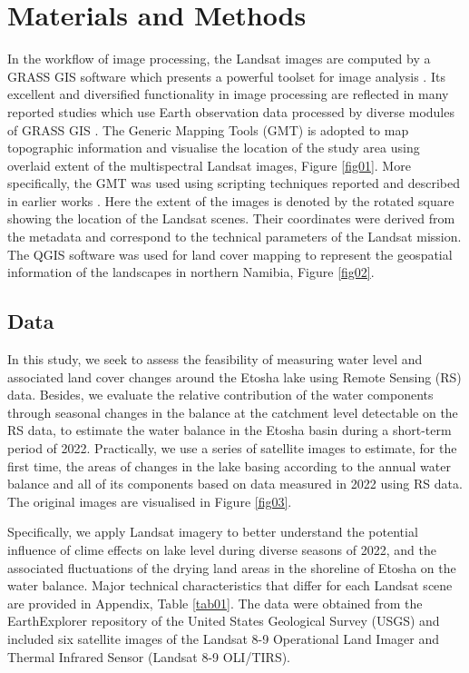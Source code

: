 \documentclass[climate,article,submit,pdftex,moreauthors]{Definitions/mdpi}
\begin{document}
\section{Materials and Methods}
 
In the workflow of image processing, the Landsat images are computed by a GRASS GIS software which presents a powerful toolset for image analysis \cite{GRASS_GIS_software}. Its excellent and diversified functionality in image processing are reflected in many reported studies which use Earth observation data processed by diverse modules of GRASS GIS \cite{HOFIERKA2009387,lemenkova2024exploitation,Lemenkova202320,ROCCHINI201382,Lemenkova202313,JASIEWICZ20111162}. The Generic Mapping Tools (GMT) \cite{Wessel} is adopted to map topographic information and visualise the location of the study area using overlaid extent of the multispectral Landsat images, Figure \ref{fig01}. More specifically, the GMT was used using scripting techniques reported and described in earlier works \cite{Lemenkova202203,Lemenkova202217}. Here the extent of the images is denoted by the rotated square showing the location of the Landsat scenes. Their coordinates were derived from the metadata and correspond to the technical parameters of the Landsat mission. The QGIS software was used for land cover mapping to represent the geospatial information of the landscapes in northern Namibia, Figure \ref{fig02}. 

\subsection{Data}
{In this study, we seek to assess the feasibility of measuring  water level and associated land cover changes around the Etosha lake using Remote Sensing (RS) data. Besides, we evaluate the relative contribution of the water components through seasonal changes in the balance at the catchment level detectable on the RS data, to estimate the water balance in the Etosha basin during a short-term period of 2022. Practically, we use a series of satellite images to estimate, for the first time, the areas of changes in the lake basing according to the annual water balance and all of its components based on data measured in 2022 using RS data.} The original images are visualised in Figure \ref{fig03}. 

{Specifically, we apply Landsat imagery to better understand the potential influence of clime effects on lake level during diverse seasons of 2022, and the associated fluctuations of the drying land areas in the shoreline of Etosha on the water balance. }Major technical characteristics that differ for each Landsat scene are provided in {Appendix, }Table \ref{tab01}. The data were obtained from the EarthExplorer repository of the United States Geological Survey (USGS) and included six satellite images of the Landsat 8-9 Operational Land Imager and Thermal Infrared Sensor (Landsat 8-9 OLI/TIRS). 
\end{document}
